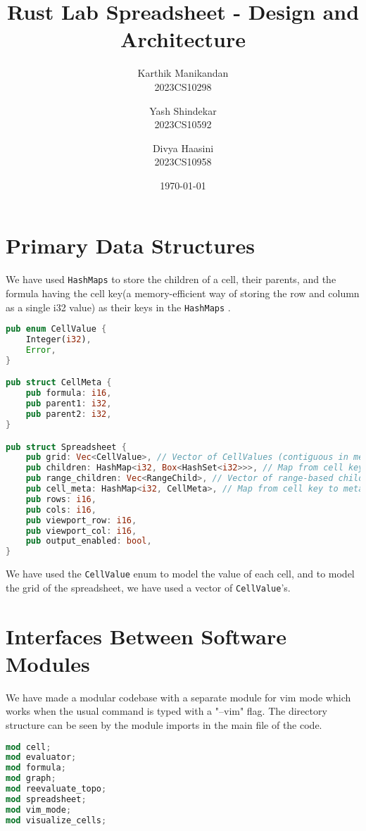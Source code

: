\documentclass[11pt,a4paper]{article}
\title{Rust Lab Spreadsheet - Design and Architecture}
\author{
  Karthik Manikandan\\ 2023CS10298
  \and
  Yash Shindekar \\ 2023CS10592
  \and
  Divya Haasini \\2023CS10958
}
\date{\today}
\begin{document}
\maketitle
\tableofcontents
\newpage

\section{Primary Data Structures}
\label{sec:data-structures}  

We have used \lstinline{HashMaps} to store the children of a cell, their parents, and the formula having the cell key(a memory-efficient way of storing the row and column as a single i32 value) as their keys in the \lstinline{HashMaps} . 

\begin{lstlisting}[language=Rust, caption={The spreadsheet Struct having the Hashmaps as described}, label=lst:types]
pub enum CellValue {
    Integer(i32),
    Error,
}

pub struct CellMeta {
    pub formula: i16,
    pub parent1: i32,
    pub parent2: i32,
}

pub struct Spreadsheet {
    pub grid: Vec<CellValue>, // Vector of CellValues (contiguous in memory)
    pub children: HashMap<i32, Box<HashSet<i32>>>, // Map from cell key to boxed HashSet of children
    pub range_children: Vec<RangeChild>, // Vector of range-based child relationships
    pub cell_meta: HashMap<i32, CellMeta>, // Map from cell key to metadata
    pub rows: i16,
    pub cols: i16,
    pub viewport_row: i16,
    pub viewport_col: i16,
    pub output_enabled: bool,
}
\end{lstlisting}
We have used the \lstinline{CellValue} enum to model the value of each cell, and to model the grid of the spreadsheet, we have used a vector of \lstinline{CellValue}'s.


\section{Interfaces Between Software Modules}
\label{sec:interfaces}

We have made a modular codebase with a separate module for vim mode which works when the usual command is typed with a "--vim" flag.
The directory structure can be seen by the module imports in the main file of the code.

\begin{lstlisting}[language=Rust, caption={Modules of our codebase}, label=lst:modules]
mod cell;
mod evaluator;
mod formula;
mod graph;
mod reevaluate_topo;
mod spreadsheet;
mod vim_mode;
mod visualize_cells;
\end{lstlisting}
\end{document}
